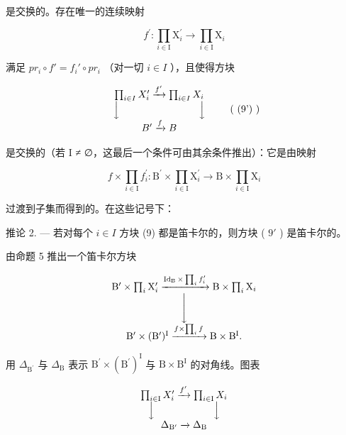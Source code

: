 是交换的。存在唯一的连续映射

\[
f ^ {\prime} \colon \prod_ {i \in \mathrm{I}} \mathrm{X} _ {i} ^ {\prime} \to \prod_ {i \in \mathrm{I}} \mathrm{X} _ {i}
\]

满足 \(pr_{i} \circ f' = f_{i}' \circ pr_{i}\) （对一切 \(i \in I\) ），且使得方块

\[
\begin{array}{c} \prod_ {i \in I} X _ {i} ^ {\prime} \xrightarrow {f ^ {\prime}} \prod_ {i \in I} X _ {i} \\ \Big \downarrow \qquad \qquad \qquad \qquad \Big \downarrow \\ B ^ {\prime} \xrightarrow {f} B \end{array}\tag{ (9') }
\]

是交换的（若 I ≠ ∅，这最后一个条件可由其余条件推出）：它是由映射

\[
f \times \prod_ {i \in \mathrm{I}} f _ {i} ^ {\prime} \colon \mathrm{B} ^ {\prime} \times \prod_ {i \in \mathrm{I}} \mathrm{X} _ {i} ^ {\prime} \to \mathrm{B} \times \prod_ {i \in \mathrm{I}} \mathrm{X} _ {i}
\]

过渡到子集而得到的。在这些记号下：

推论 2. --- 若对每个 \(i \in I\) 方块 (9) 都是笛卡尔的，则方块 ( \(9'\) ) 是笛卡尔的。

由命题 5 推出一个笛卡尔方块

\[
\begin{array}{c} \mathrm{B} ^ {\prime} \times \prod_ {i} \mathrm{X} _ {i} ^ {\prime} \xrightarrow {\operatorname{Id} _ {\mathrm{B}} \times \prod_ {i} f _ {i} ^ {\prime}} \mathrm{B} \times \prod_ {i} \mathrm{X} _ {i} \\ \Biggl \downarrow \\ \mathrm{B} ^ {\prime} \times (\mathrm{B} ^ {\prime}) ^ {\mathrm{I}} \xrightarrow {f \times \prod_ {i} f} \mathrm{B} \times \mathrm{B} ^ {\mathrm{I}}  . \end{array}
\]

用 \(\Delta_{\mathrm{B}^{\prime}}\) 与 \(\Delta_{\mathrm{B}}\) 表示 \(\mathrm{B}^{\prime}\times (\mathrm{B}^{\prime})^{\mathrm{I}}\) 与 \(\mathrm{B}\times \mathrm{B}^{\mathrm{I}}\) 的对角线。图表

\[
\begin{array}{c} \prod_ {i \in \mathrm{I}} X _ {i} ^ {\prime} \xrightarrow {f ^ {\prime}} \prod_ {i \in \mathrm{I}} X _ {i} \\ \Big \downarrow \qquad \qquad \qquad \Big \downarrow \\ \Delta_ {\mathrm{B} ^ {\prime}} \xrightarrow {} \Delta_ {\mathrm{B}} \end{array}
\]

